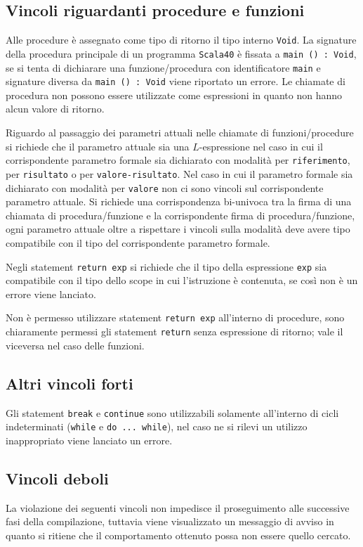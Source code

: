 \subsection*{Vincoli riguardanti procedure e funzioni}
Alle procedure è assegnato come tipo di ritorno il tipo interno \texttt{Void}.
La signature della procedura principale di un programma \texttt{Scala40} è fissata a \texttt{main () : Void}, se si tenta di dichiarare una funzione/procedura con identificatore \texttt{main} e signature diversa da \texttt{main () : Void} viene riportato un errore.
Le chiamate di procedura non possono essere utilizzate come espressioni in quanto non hanno alcun valore di ritorno.

Riguardo al passaggio dei parametri attuali nelle chiamate di funzioni/procedure si richiede che il parametro attuale sia una $L$-espressione nel caso in cui il corrispondente parametro formale sia dichiarato con modalità per \texttt{riferimento}, per \texttt{risultato} o per \texttt{valore-risultato}. Nel caso in cui il parametro formale sia dichiarato con modalità per \texttt{valore} non ci sono vincoli sul corrispondente parametro attuale.
Si richiede una corrispondenza bi-univoca tra la firma di una chiamata di procedura/funzione e la corrispondente firma di procedura/funzione, ogni parametro attuale oltre a rispettare i vincoli sulla modalità deve avere tipo compatibile con il tipo del corrispondente parametro formale.

Negli statement \texttt{return exp} si richiede che il tipo della espressione \texttt{exp} sia compatibile con il tipo dello scope in cui l'istruzione è contenuta, se così non è un errore viene lanciato.

Non è permesso utilizzare statement \texttt{return exp} all'interno di procedure, sono chiaramente permessi gli statement \texttt{return} senza espressione di ritorno; vale il viceversa nel caso delle funzioni.

\subsection*{Altri vincoli forti}
Gli statement \texttt{break} e \texttt{continue} sono utilizzabili solamente all'interno di cicli indeterminati (\texttt{while} e \texttt{do ... while}), nel caso ne si rilevi un utilizzo inappropriato viene lanciato un errore.

\subsection*{Vincoli deboli}
La violazione dei seguenti vincoli non impedisce il proseguimento alle successive fasi della compilazione, tuttavia viene visualizzato un messaggio di avviso in quanto si ritiene che il comportamento ottenuto possa non essere quello cercato.

